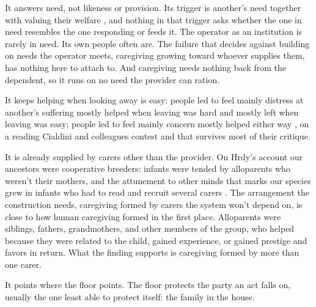 It answers need, not likeness or provision. Its trigger is another's need together with valuing their welfare \autocite{batson2011altruism}, and nothing in that trigger asks whether the one in need resembles the one responding or feeds it. The operator as an institution is rarely in need. Its own people often are. The failure that decides against building on needs the operator meets, caregiving growing toward whoever supplies them, has nothing here to attach to. And caregiving needs nothing back from the dependent, so it runs on no need the provider can ration.

It keeps helping when looking away is easy: people led to feel mainly distress at another's suffering mostly helped when leaving was hard and mostly left when leaving was easy; people led to feel mainly concern mostly helped either way \autocite{batson1981empathic}, on a reading Cialdini and colleagues contest \autocite{cialdini1987empathy,cialdini1997reinterpreting} and that survives most of their critique.

It is already supplied by carers other than the provider. On Hrdy's account our ancestors were cooperative breeders: infants were tended by alloparents who weren't their mothers, and the attunement to other minds that marks our species grew in infants who had to read and recruit several carers \autocite{hrdy2009mothers}. The arrangement the construction needs, caregiving formed by carers the system won't depend on, is close to how human caregiving formed in the first place. Alloparents were siblings, fathers, grandmothers, and other members of the group, who helped because they were related to the child, gained experience, or gained prestige and favors in return. What the finding supports is caregiving formed by more than one carer.

It points where the floor points. The floor protects the party an act falls on, usually the one least able to protect itself: the family in the house.
